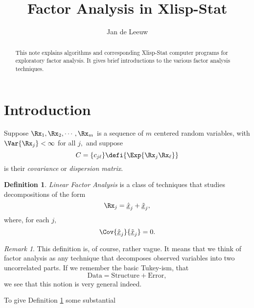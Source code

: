 \documentclass[12pt]{amsart}
\theoremstyle{definition}
\newtheorem{definition}[theorem]{Definition}
\theoremstyle{remark}
\newtheorem{remark}[theorem]{Remark}
\numberwithin{equation}{section}
\begin{document}
\title[Factor Analysis]{Factor Analysis in Xlisp-Stat}
\author{Jan de Leeuw}
\address{UCLA Statistics Program\\
8118 Mathematical Sciences Building\\
University of California at Los Angeles}
\maketitle
\begin{abstract}
This note explains algorithms and corresponding
Xlisp-Stat computer programs for exploratory
factor analysis. It gives brief introductions
to the various factor analysis techniques.
\end{abstract}
%
\tableofcontents
%
\section{Introduction}\label{s:intro}
%
Suppose $\Rx_1,\Rx_2,\cdots,\Rx_m$ is a sequence of
$m$ centered random variables, with $\Var{\Rx_j}<\infty$
for all $j,$
and suppose
%
\begin{equation}\label{e:disp}
C=\{c_{j\ell}\}\defi\{\Exp{\Rx_j\Rx_\ell}\}
\end{equation}
%
is their \textit{covariance} or \textit{dispersion matrix}.\par
%
\begin{definition}\label{d:fac}
\textit{Linear Factor Analysis} is a class of techniques that
studies decompositions of the form 
%
\begin{equation}\label{e:decomp}
\Rx_j=\underline{\hat x}_j+\underline{\tilde x}_j,
\end{equation}
%
where, for each $j,$ 
%
\begin{equation}\label{e:orth}
\Cov{\underline{\hat x}_j}{\underline{\tilde x}_j}=0.
\end{equation}
%
\end{definition}
%
\begin{remark}\label{r:fadefi}
This definition is, of course, rather vague. It means that we
think of factor analysis as any technique that decomposes observed
variables into two uncorrelated parts. If we remember the basic
Tukey-ism, that
%
\begin{equation*}
\mathrm{Data}=\mathrm{Structure}+\mathrm{Error}, 
\end{equation*}
%
we see that this
notion is very general indeed. 
\end{remark}
%
To give Definition \ref{d:fac} some substantial
\end{document}
